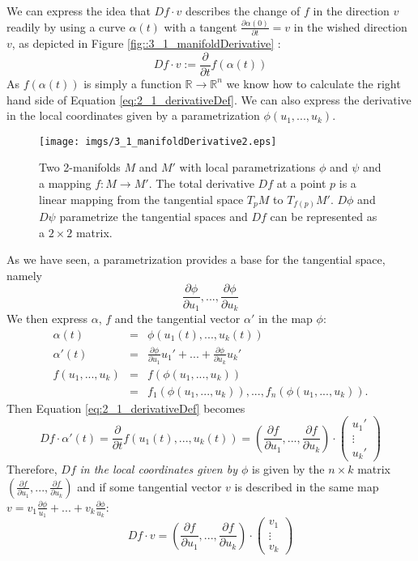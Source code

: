 We can express the idea that $Df\cdot v$ describes the change of $f$ in the direction $v$ readily by using a curve $\alpha (t)$ with a tangent $\frac{\partial \alpha(0)}{\partial t} = v$ in the wished direction $v$, as depicted in Figure \ref{fig::3_1_manifoldDerivative} :
\begin{equation} Df \cdot v := \frac{\partial}{\partial t} f(\alpha(t)) \label{eq:2_1_derivativeDef}\end{equation}
As $f(\alpha(t))$ is simply a function $\mathbb R \rightarrow \mathbb R^n$ we know how to calculate the right hand side of Equation \ref{eq:2_1_derivativeDef}. We can also express the derivative in the local coordinates given by a parametrization $\phi(u_1,...,u_k)$.


\begin{figure}
\begin{center}
\texttt{[image: imgs/3\_1\_manifoldDerivative2.eps]}
\end{center}
\caption{Two 2-manifolds $M$ and $M'$ with local parametrizations $\phi$ and $\psi$ and a mapping $f: M \rightarrow M'$. The total derivative $Df$ at a point $p$ is a linear mapping from the tangential space $T_p M$ to $T_{f(p)} M'$. $D\phi$ and $D \psi$ parametrize the tangential spaces and $Df$ can be represented as a $2\times 2$ matrix.}
\label{fig::3_1_manifoldDerivative2}
\end{figure}


As we have seen, a parametrization provides a base for the tangential space, namely 
\[\frac{\partial\phi}{\partial u_1},..., \frac{\partial\phi}{\partial u_k}\] 
We then express $\alpha$, $f$ and the tangential vector $\alpha'$ in the map $\phi$:
\begin{eqnarray*} \alpha(t) &=& \phi(u_1(t),...,u_k(t))\\
\alpha'(t) &=& \frac{\partial\phi}{\partial u_1} u_1' + ... + \frac{\partial\phi}{\partial u_k} u_k'\\
 f(u_1,...,u_k) &=& f(\phi(u_1,...,u_k)) \\
 &=& f_1(\phi(u_1,...,u_k)),...,f_n(\phi(u_1,...,u_k)). \end{eqnarray*} 
Then Equation \ref{eq:2_1_derivativeDef} becomes
\[Df \cdot \alpha'(t) = \frac{\partial}{\partial t}f(u_1(t),...,u_k(t)) = (\frac{\partial f}{\partial u_1},..., \frac{\partial f}{\partial u_k}) \cdot \begin{pmatrix}
	u_1' \\ \vdots \\ u_k'\end{pmatrix}\]
Therefore, $Df$ \emph{in the local coordinates given by $\phi$} is given by the $ n \times k$ matrix $(\frac{\partial f}{\partial u_1},..., \frac{\partial f}{\partial u_k})$ and if some tangential vector $v$ is described in the same map $v = v_1 \frac{\partial \phi}{u_1} +...+ v_k \frac{\partial \phi}{u_k}$:
\[Df \cdot v = (\frac{\partial f}{\partial u_1},..., \frac{\partial f}{\partial u_k}) \cdot \begin{pmatrix}
	v_1 \\ \vdots \\ v_k\end{pmatrix}\]


